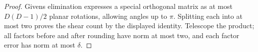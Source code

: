 \begin{proof}
Givens elimination expresses a special orthogonal matrix as at most
$D(D-1)/2$ planar rotations, allowing angles up to $\pi$.
Splitting each into at most two proves the shear count by the displayed
identity. Telescope the product; all factors before and after rounding
have norm at most two, and each factor error has norm at most $\delta$.
\end{proof}
